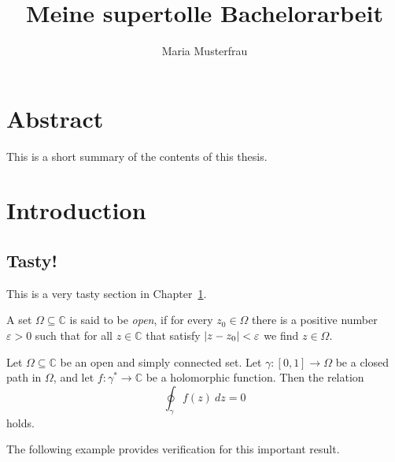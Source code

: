 \documentclass[11pt, twoside, bachelor]{bhthesis}
\title{Meine supertolle Bachelorarbeit}
\author{Maria Musterfrau}
\DeclarePairedDelimiter{\abs}{\lvert}{\rvert}
\begin{document}
\maketitle
  
\chapter*{Abstract}
This is a short summary of the contents of this thesis.

\tableofcontents

\chapter{Introduction}\label{chap:intro}
  
\section{Tasty!}
This is a very tasty section in Chapter~\ref{chap:intro}.

\begin{definition}
  A set $\Omega\subseteq\mathbb{C}$ is said to be \emph{open}, if for every
  $z_{0}\in\Omega$ there is a positive number $\varepsilon > 0$ such
  that for all $z\in\mathbb{C}$ that satisfy $\abs{z - z_{0}} <
  \varepsilon$ we find $z\in\Omega$.
\end{definition}

\begin{theorem}\label{thm:cauchy}
  Let $\Omega\subseteq\mathbb{C}$ be an open and simply connected
  set. Let $\gamma:[0,1]\to \Omega$ be a closed path in $\Omega$, and
  let $f\colon\gamma^{*} \to \mathbb{C}$ be a holomorphic function.
  Then the relation
  \begin{equation}\label{eq:cauchy-integral}
    \oint_{\gamma} f(z)~dz = 0
  \end{equation}
  holds.
\end{theorem}

The following example provides verification for this important result.
\end{document}
